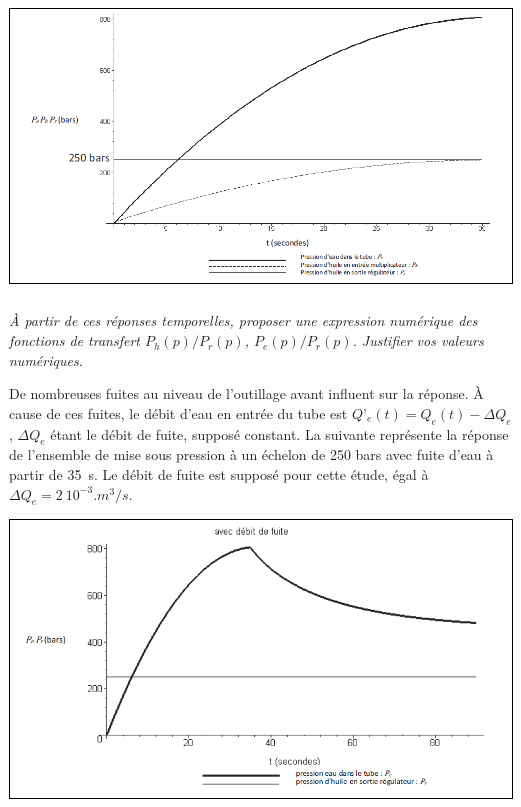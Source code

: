 \documentclass[10pt,fleqn]{article} %
\begin{document}
\begin{multicols}{2}
\begin{center}
\includegraphics[width=\linewidth]{images_02/fig_04}
\end{center}

\subparagraph{}
\textit{À partir de ces réponses temporelles, proposer une expression numérique des fonctions de transfert $P_h(p)/P_r(p)$, $P_e(p)/P_r(p)$. Justifier vos valeurs numériques.}

\vspace{.25cm}

De nombreuses fuites au niveau de l’outillage avant influent sur la réponse. À cause de ces fuites, le débit d’eau en entrée du tube est $Q’_e(t) = Q_e(t)-\Delta Q_e$, $\Delta Q_e$ étant le débit de fuite, supposé constant.
La suivante représente la réponse de l’ensemble de mise sous pression à un échelon de 250 bars avec fuite d’eau à partir de \SI{35}{s}. Le débit de fuite est supposé pour cette étude, égal à $\Delta Q_e = \SI{2}{10^{-3}.m^3/s}$.

\begin{center}
\includegraphics[width=\linewidth]{images_02/fig_05}
\end{center}


\end{multicols}
\end{document}
